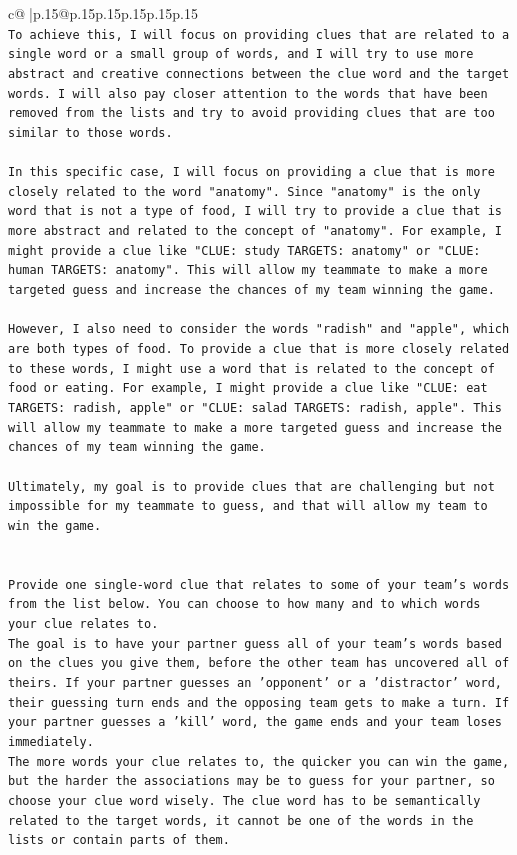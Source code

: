 \documentclass{article}
\begin{document}
{\begin{supertabular}{c@{$\;$}|p{.15\linewidth}@{}p{.15\linewidth}p{.15\linewidth}p{.15\linewidth}p{.15\linewidth}p{.15\linewidth}}
{{{\\ 
\texttt{To achieve this, I will focus on providing clues that are related to a single word or a small group of words, and I will try to use more abstract and creative connections between the clue word and the target words. I will also pay closer attention to the words that have been removed from the lists and try to avoid providing clues that are too similar to those words.} \\
\\ 
\texttt{In this specific case, I will focus on providing a clue that is more closely related to the word "anatomy". Since "anatomy" is the only word that is not a type of food, I will try to provide a clue that is more abstract and related to the concept of "anatomy". For example, I might provide a clue like "CLUE: study TARGETS: anatomy" or "CLUE: human TARGETS: anatomy". This will allow my teammate to make a more targeted guess and increase the chances of my team winning the game.} \\
\\ 
\texttt{However, I also need to consider the words "radish" and "apple", which are both types of food. To provide a clue that is more closely related to these words, I might use a word that is related to the concept of food or eating. For example, I might provide a clue like "CLUE: eat TARGETS: radish, apple" or "CLUE: salad TARGETS: radish, apple". This will allow my teammate to make a more targeted guess and increase the chances of my team winning the game.} \\
\\ 
\texttt{Ultimately, my goal is to provide clues that are challenging but not impossible for my teammate to guess, and that will allow my team to win the game.} \\
\\ 
\\ 
\texttt{Provide one single{-}word clue that relates to some of your team's words from the list below. You can choose to how many and to which words your clue relates to.} \\
\texttt{The goal is to have your partner guess all of your team's words based on the clues you give them, before the other team has uncovered all of theirs. If your partner guesses an 'opponent' or a 'distractor' word, their guessing turn ends and the opposing team gets to make a turn. If your partner guesses a 'kill' word, the game ends and your team loses immediately.} \\
\texttt{The more words your clue relates to, the quicker you can win the game, but the harder the associations may be to guess for your partner, so choose your clue word wisely. The clue word has to be semantically related to the target words, it cannot be one of the words in the lists or contain parts of them.} \\
}}}
\end{supertabular}}
\end{document}

